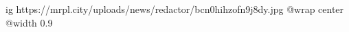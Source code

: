  
 
 
 
 

\ifcmt
  ig https://mrpl.city/uploads/news/redactor/bcn0hihzofn9j8dy.jpg
  @wrap center
  @width 0.9
\fi
